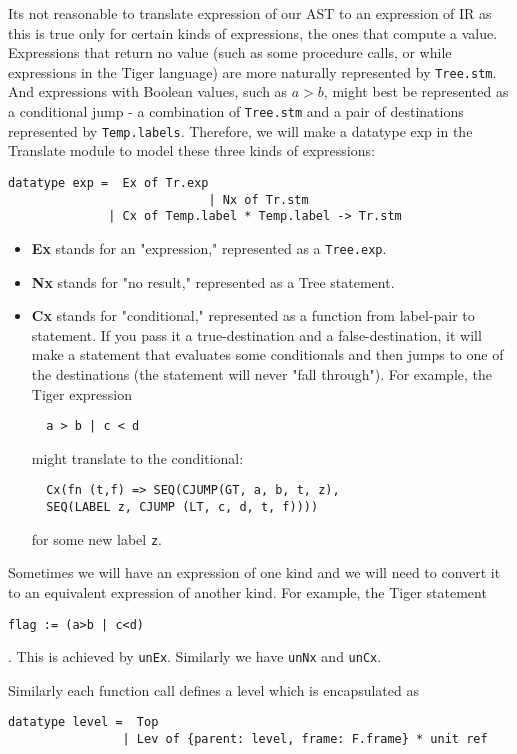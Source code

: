 Its not reasonable to translate expression of our AST to an expression of IR as this is true only for certain kinds of expressions, the ones that  compute a value. Expressions that return no value (such as some procedure calls, or while expressions in the Tiger language) are more naturally represented by \texttt{Tree.stm}. And expressions with Boolean values, such as $a > b$, might best be represented as a conditional jump - a combination of \texttt{Tree.stm} and a pair of destinations represented by \texttt{Temp.labels}. Therefore, we will make a datatype exp in the Translate module to model these three kinds of expressions:

\begin{verbatim}
datatype exp =  Ex of Tr.exp
							| Nx of Tr.stm
              | Cx of Temp.label * Temp.label -> Tr.stm
\end{verbatim}

\begin{itemize}

\item \textbf{Ex} stands for an "expression," represented as a \texttt{Tree.exp}.
\item \textbf{Nx} stands for "no result," represented as a Tree statement.
\item \textbf{Cx} stands for "conditional," represented as a function from label-pair to  statement. If you pass it a true-destination and a false-destination, it will make a statement that evaluates some conditionals and then jumps to one of the  destinations (the statement will never "fall through"). For example, the Tiger expression 
  \begin{verbatim}
  a > b | c < d
  \end{verbatim} 
  might translate to the  conditional:
  \begin{verbatim}
  Cx(fn (t,f) => SEQ(CJUMP(GT, a, b, t, z),
  SEQ(LABEL z, CJUMP (LT, c, d, t, f))))
  \end{verbatim}
  for some new label \texttt{z}.
\end{itemize}

Sometimes we will have an expression of one kind and we will need to convert it to an equivalent expression of another kind. For example, the Tiger statement
\begin{verbatim}
flag := (a>b | c<d)
\end{verbatim}
. This is achieved by \texttt{unEx}. Similarly we have \texttt{unNx} and \texttt{unCx}.

Similarly each function call defines a level which is encapsulated as 
\begin{verbatim}
datatype level =  Top
                | Lev of {parent: level, frame: F.frame} * unit ref
\end{verbatim} 

